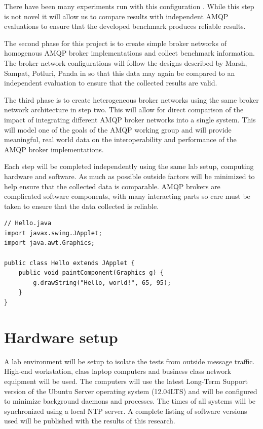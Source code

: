 \documentclass{thesis}
\begin{document}
There have been many experiments run with this configuration \cite{BENCHMARK1} \cite{BENCHMARK2}.  While this step is not novel it will allow us to compare results with independent AMQP evaluations to ensure that the developed benchmark produces reliable results. 

The second phase for this project is to create simple broker networks of homogenous AMQP broker implementations and collect benchmark information.  The broker network configurations will follow the designs described by Marsh, Sampat, Potluri, Panda in \cite{Scaling AMQP} so that this data may again be compared to an independent evaluation to ensure that the collected results are valid.

The third phase is to create heterogeneous broker networks using the same broker network architecture in step two.  This will allow for direct comparison of the impact of integrating different AMQP broker networks into a single system.  This will model one of the goals of the AMQP working group and will provide meaningful, real world data on the interoperability and performance of the AMQP broker implementations. 

Each step will be completed independently using the same lab setup, computing hardware and software.  As much as possible outside factors will be minimized to help ensure that the collected data is comparable.  AMQP brokers are complicated software components, with many interacting parts so care must be taken to ensure that the data collected is reliable.  



\begin{lstlisting}
// Hello.java
import javax.swing.JApplet;
import java.awt.Graphics;

public class Hello extends JApplet {
    public void paintComponent(Graphics g) {
        g.drawString("Hello, world!", 65, 95);
    }    
}
\end{lstlisting}


\section{Hardware setup}
A lab environment will be setup to isolate the tests from outside message traffic.  High-end workstation, class laptop computers and business class network equipment will be used.  The computers will use the latest Long-Term Support version of the Ubuntu Server operating system (12.04LTS) and will be configured to minimize background daemons and processes.  The times of all systems will be synchronized using a local NTP server. A complete listing of software versions used will be published with the results of this research.
\end{document}
